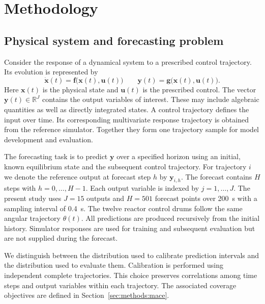 \section{Methodology}
\label{sec:methods}

\subsection{Physical system and forecasting problem}
\label{sec:methods:problem}

Consider the response of a dynamical system to a prescribed control trajectory. Its evolution is represented by
\begin{equation}
 \dot{\mathbf{x}}(t)=\mathbf{f}\bigl(\mathbf{x}(t),\mathbf{u}(t)\bigr)
 \qquad
 \mathbf{y}(t)=\mathbf{g}\bigl(\mathbf{x}(t),\mathbf{u}(t)\bigr).
 \label{eq:mace:system}
\end{equation}
Here $\mathbf{x}(t)$ is the physical state and $\mathbf{u}(t)$ is the prescribed control. The vector $\mathbf{y}(t)\in\mathbb{R}^{J}$ contains the output variables of interest. These may include algebraic quantities as well as directly integrated states. A control trajectory defines the input over time. Its corresponding multivariate response trajectory is obtained from the reference simulator. Together they form one trajectory sample for model development and evaluation.

The forecasting task is to predict $\mathbf{y}$ over a specified horizon using an initial, known equilibrium state and the subsequent control trajectory. For trajectory $i$ we denote the reference output at forecast step $h$ by $\mathbf{y}_{i,h}$. The forecast contains $H$ steps with $h=0,\ldots,H-1$. Each output variable is indexed by $j=1,\ldots,J$. The present study uses $J=15$ outputs and $H=501$ forecast points over 200~s with a sampling interval of 0.4~s. The twelve reactor control drums follow the same angular trajectory $\theta(t)$. All predictions are produced recursively from the initial history. Simulator responses are used for training and subsequent evaluation but are not supplied during the forecast.

We distinguish between the distribution used to calibrate prediction intervals and the distribution used to evaluate them. Calibration is performed using independent complete trajectories. This choice preserves correlations among time steps and output variables within each trajectory. The associated coverage objectives are defined in Section~\ref{sec:methods:mace}.

